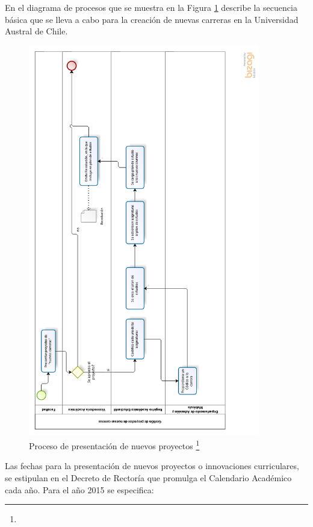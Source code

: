 		En el diagrama de procesos que se muestra en la Figura \ref{Figura2} describe la secuencia básica que se lleva a cabo para la creación de nuevas carreras en la Universidad Austral de Chile.
		\begin{figure}[H]
			\centering
			\includegraphics[width=0.9\textwidth]{images/Capitulo_1/Procesos_Registro_academico.png}
			\caption[Proceso de presentación de nuevos proyectos]{Proceso de presentación de nuevos proyectos \footnote{}}
			\label{Figura2}
		\end{figure}
		
		Las fechas para la presentación de nuevos proyectos o innovaciones curriculares, se estipulan en el Decreto de Rectoría  que promulga el Calendario Académico cada año. Para el año 2015 se especifica:
		
